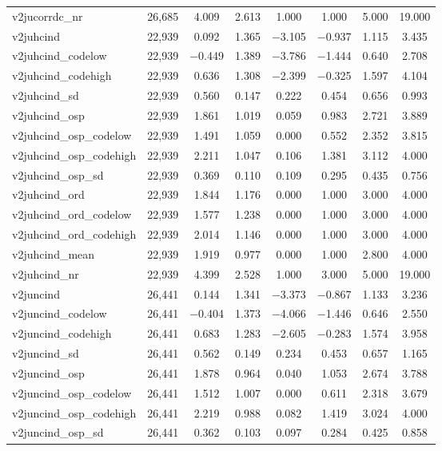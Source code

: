 \begin{table}[!htbp]
\begin{tabular}{@{\extracolsep{5pt}}lccccccc}
v2jucorrdc\_nr & 26,685 & 4.009 & 2.613 & 1.000 & 1.000 & 5.000 & 19.000 \\ 
v2juhcind & 22,939 & 0.092 & 1.365 & $-$3.105 & $-$0.937 & 1.115 & 3.435 \\ 
v2juhcind\_codelow & 22,939 & $-$0.449 & 1.389 & $-$3.786 & $-$1.444 & 0.640 & 2.708 \\ 
v2juhcind\_codehigh & 22,939 & 0.636 & 1.308 & $-$2.399 & $-$0.325 & 1.597 & 4.104 \\ 
v2juhcind\_sd & 22,939 & 0.560 & 0.147 & 0.222 & 0.454 & 0.656 & 0.993 \\ 
v2juhcind\_osp & 22,939 & 1.861 & 1.019 & 0.059 & 0.983 & 2.721 & 3.889 \\ 
v2juhcind\_osp\_codelow & 22,939 & 1.491 & 1.059 & 0.000 & 0.552 & 2.352 & 3.815 \\ 
v2juhcind\_osp\_codehigh & 22,939 & 2.211 & 1.047 & 0.106 & 1.381 & 3.112 & 4.000 \\ 
v2juhcind\_osp\_sd & 22,939 & 0.369 & 0.110 & 0.109 & 0.295 & 0.435 & 0.756 \\ 
v2juhcind\_ord & 22,939 & 1.844 & 1.176 & 0.000 & 1.000 & 3.000 & 4.000 \\ 
v2juhcind\_ord\_codelow & 22,939 & 1.577 & 1.238 & 0.000 & 1.000 & 3.000 & 4.000 \\ 
v2juhcind\_ord\_codehigh & 22,939 & 2.014 & 1.146 & 0.000 & 1.000 & 3.000 & 4.000 \\ 
v2juhcind\_mean & 22,939 & 1.919 & 0.977 & 0.000 & 1.000 & 2.800 & 4.000 \\ 
v2juhcind\_nr & 22,939 & 4.399 & 2.528 & 1.000 & 3.000 & 5.000 & 19.000 \\ 
v2juncind & 26,441 & 0.144 & 1.341 & $-$3.373 & $-$0.867 & 1.133 & 3.236 \\ 
v2juncind\_codelow & 26,441 & $-$0.404 & 1.373 & $-$4.066 & $-$1.446 & 0.646 & 2.550 \\ 
v2juncind\_codehigh & 26,441 & 0.683 & 1.283 & $-$2.605 & $-$0.283 & 1.574 & 3.958 \\ 
v2juncind\_sd & 26,441 & 0.562 & 0.149 & 0.234 & 0.453 & 0.657 & 1.165 \\ 
v2juncind\_osp & 26,441 & 1.878 & 0.964 & 0.040 & 1.053 & 2.674 & 3.788 \\ 
v2juncind\_osp\_codelow & 26,441 & 1.512 & 1.007 & 0.000 & 0.611 & 2.318 & 3.679 \\ 
v2juncind\_osp\_codehigh & 26,441 & 2.219 & 0.988 & 0.082 & 1.419 & 3.024 & 4.000 \\ 
v2juncind\_osp\_sd & 26,441 & 0.362 & 0.103 & 0.097 & 0.284 & 0.425 & 0.858 \\ 

\end{tabular}
\end{table}
